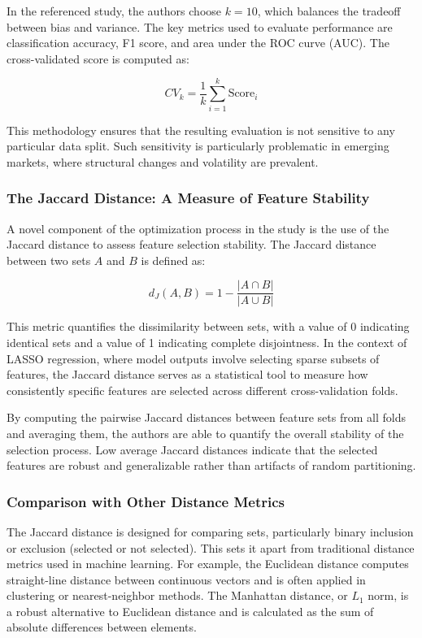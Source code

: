 In the referenced study, the authors choose $k = 10$, which balances the tradeoff between bias and variance. The key metrics used to evaluate performance are classification accuracy, F1 score, and area under the ROC curve (AUC). The cross-validated score is computed as:

\[
CV_k = \frac{1}{k} \sum_{i=1}^{k} \text{Score}_i
\]

This methodology ensures that the resulting evaluation is not sensitive to any particular data split. Such sensitivity is particularly problematic in emerging markets, where structural changes and volatility are prevalent.

\subsubsection{The Jaccard Distance: A Measure of Feature Stability}

A novel component of the optimization process in the study is the use of the Jaccard distance to assess feature selection stability. The Jaccard distance between two sets $A$ and $B$ is defined as:

\[
d_J(A, B) = 1 - \frac{|A \cap B|}{|A \cup B|}
\]

This metric quantifies the dissimilarity between sets, with a value of 0 indicating identical sets and a value of 1 indicating complete disjointness. In the context of LASSO regression, where model outputs involve selecting sparse subsets of features, the Jaccard distance serves as a statistical tool to measure how consistently specific features are selected across different cross-validation folds.

By computing the pairwise Jaccard distances between feature sets from all folds and averaging them, the authors are able to quantify the overall stability of the selection process. Low average Jaccard distances indicate that the selected features are robust and generalizable rather than artifacts of random partitioning.

\subsubsection{Comparison with Other Distance Metrics}

The Jaccard distance is designed for comparing sets, particularly binary inclusion or exclusion (selected or not selected). This sets it apart from traditional distance metrics used in machine learning. For example, the Euclidean distance computes straight-line distance between continuous vectors and is often applied in clustering or nearest-neighbor methods. The Manhattan distance, or $L_1$ norm, is a robust alternative to Euclidean distance and is calculated as the sum of absolute differences between elements.

